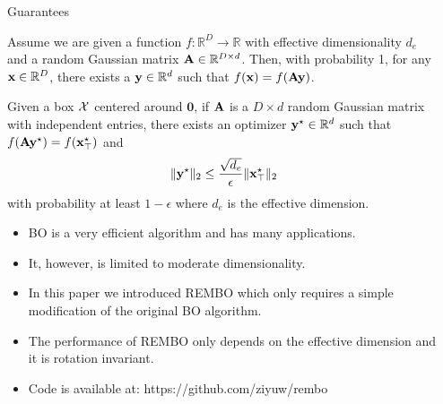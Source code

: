 \documentclass[final]{beamer}
\begin{document}
\begin{frame}[t]
\begin{columns}[T]
\begin{column}{.48\textwidth}
\end{column}

\begin{column}{.48\textwidth}
\begin{block}{Guarantees}
\begin{theorem}
   \label{prop:1}
   Assume we are given a function $f: \mathbb{R}^{D} \rightarrow \mathbb{R}$ with effective dimensionality $d_e$ and a random Gaussian matrix $\mathbf{A} \in \mathbb{R}^{D\times d}$. Then, with probability 1, for any $\mathbf{x} \in \mathbb{R}^D$, there exists a $ \mathbf{y} \in \mathbb{R}^d$ such that $f(\mathbf{x}) = f(\mathbf{A}\mathbf{y})$.
  \end{theorem}

 \begin{theorem}
   \label{prop:2}
   Given a box $\cal X$ centered around $\mathbf{0}$, if $\mathbf{A}$ is a $D\times d$ random Gaussian matrix 
   with independent entries,
   there exists an optimizer $\mathbf{y}^\star \in \mathbb{R}^{d}$ such that $f(\mathbf{A}\mathbf{y}^\star) = f(\mathbf{x}^\star_\top)$ and $$\|\mathbf{y}^\star\|_2 \leq \frac{\sqrt{d_e}}{\epsilon}\|\mathbf{x}^{\star}_\top\|_2$$ with probability at least $1-\epsilon$ where $d_e$ is
   the effective dimension.
 \end{theorem}
\end{block}

\begin{block}
 \begin{itemize}
   \item BO is a very efficient algorithm and has many applications.
   \item It, however, is limited to moderate dimensionality.
   \item In this paper we introduced REMBO which only requires a simple modification of the original BO algorithm.
   \item The performance of REMBO only depends on the effective dimension and it is rotation invariant.
   \item Code is available at: https://github.com/ziyuw/rembo
  \end{itemize}
\end{block}


\end{column}
\end{columns}
\end{frame}
\end{document}
